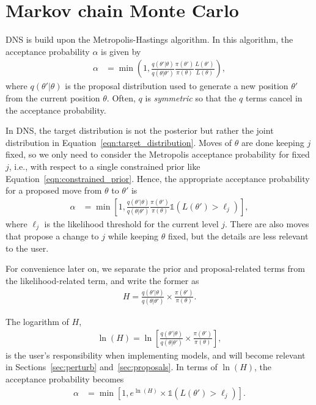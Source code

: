 \documentclass[article]{jss}
\newcommand{\params}{\theta}
\begin{document}
\section{Markov chain Monte Carlo}\label{sec:mcmc}
DNS is build upon the Metropolis-Hastings algorithm.
In this algorithm, the acceptance probability $\alpha$
is given by
\begin{align*}
\alpha &= \min\left(1,
\frac{q(\params'|\params)}{q(\params | \params')}
\frac{\pi(\params')}{\pi(\params)}\frac{L(\params')}{L(\params)}
\right),
\end{align*}
where $q(\theta' | \theta)$ is the proposal distribution used to generate
a new position $\theta'$ from the current position $\theta$. Often,
$q$ is {\em symmetric} so that the $q$ terms cancel in the acceptance probability.

In DNS, the target distribution is not the posterior but rather
the joint distribution in Equation~\ref{eqn:target_distribution}.
Moves of $\theta$ are done keeping $j$ fixed, so we only need
to consider the Metropolis acceptance probability for fixed $j$,
i.e., with respect to a single constrained prior like
Equation~\ref{eqn:constrained_prior}.
Hence, the appropriate acceptance probability
for a proposed move from $\theta$ to $\theta'$ is
\begin{align}
\alpha &= \min\left[1,
\frac{q(\params'|\params)}{q(\params | \params')}
\frac{\pi(\params')}{\pi(\params)}
\mathds{1}\left(L(\params') > \ell_j\right)
\right],
\label{eqn:log_hastings}
\end{align}
where $\ell_j$ is the likelihood threshold for the current level $j$.
There are also moves that propose a change to $j$ while keeping
$\params$ fixed, but the details are less relevant to the user.

For convenience later on, we 
separate the prior and proposal-related terms from
the likelihood-related term, and write the former as
\begin{align*}
H = \frac{q(\params'|\params)}{q(\params | \params')}
\times \frac{\pi(\params')}{\pi(\params)}.
\end{align*}

The logarithm of $H$,
\begin{align*}
\ln(H) = \ln\left[\frac{q(\params'|\params)}{q(\params | \params')}
\times \frac{\pi(\params')}{\pi(\params)}\right],
\end{align*}
is the user's responsibility when implementing models,
and will become relevant in Sections~\ref{sec:perturb}
and~\ref{sec:proposals}.
In terms of $\ln(H)$, the
acceptance probability becomes
\begin{align}
\alpha &= \min\left[1,
e^{\ln(H)}\times
\mathds{1}\left(L(\params') > \ell_j\right)
\right].\label{eqn:logH}
\end{align}
\end{document}
